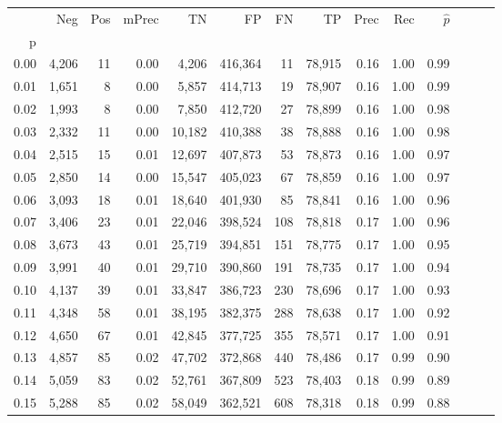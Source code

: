 \begin{tabular}{rrrrrrrrrrrrrr}
\toprule
{} &    Neg &    Pos & mPrec &       TN &       FP &      FN &      TP &  Prec &   Rec & $\hat{p}$ \\
p    &        &        &       &          &          &         &         &       &       &           \\
\midrule
0.00 &  4,206 &     11 &  0.00 &    4,206 &  416,364 &      11 &  78,915 &  0.16 &  1.00 &      0.99 \\
0.01 &  1,651 &      8 &  0.00 &    5,857 &  414,713 &      19 &  78,907 &  0.16 &  1.00 &      0.99 \\
0.02 &  1,993 &      8 &  0.00 &    7,850 &  412,720 &      27 &  78,899 &  0.16 &  1.00 &      0.98 \\
0.03 &  2,332 &     11 &  0.00 &   10,182 &  410,388 &      38 &  78,888 &  0.16 &  1.00 &      0.98 \\
0.04 &  2,515 &     15 &  0.01 &   12,697 &  407,873 &      53 &  78,873 &  0.16 &  1.00 &      0.97 \\
0.05 &  2,850 &     14 &  0.00 &   15,547 &  405,023 &      67 &  78,859 &  0.16 &  1.00 &      0.97 \\
0.06 &  3,093 &     18 &  0.01 &   18,640 &  401,930 &      85 &  78,841 &  0.16 &  1.00 &      0.96 \\
0.07 &  3,406 &     23 &  0.01 &   22,046 &  398,524 &     108 &  78,818 &  0.17 &  1.00 &      0.96 \\
0.08 &  3,673 &     43 &  0.01 &   25,719 &  394,851 &     151 &  78,775 &  0.17 &  1.00 &      0.95 \\
0.09 &  3,991 &     40 &  0.01 &   29,710 &  390,860 &     191 &  78,735 &  0.17 &  1.00 &      0.94 \\
0.10 &  4,137 &     39 &  0.01 &   33,847 &  386,723 &     230 &  78,696 &  0.17 &  1.00 &      0.93 \\
0.11 &  4,348 &     58 &  0.01 &   38,195 &  382,375 &     288 &  78,638 &  0.17 &  1.00 &      0.92 \\
0.12 &  4,650 &     67 &  0.01 &   42,845 &  377,725 &     355 &  78,571 &  0.17 &  1.00 &      0.91 \\
0.13 &  4,857 &     85 &  0.02 &   47,702 &  372,868 &     440 &  78,486 &  0.17 &  0.99 &      0.90 \\
0.14 &  5,059 &     83 &  0.02 &   52,761 &  367,809 &     523 &  78,403 &  0.18 &  0.99 &      0.89 \\
0.15 &  5,288 &     85 &  0.02 &   58,049 &  362,521 &     608 &  78,318 &  0.18 &  0.99 &      0.88 \\

\end{tabular}
